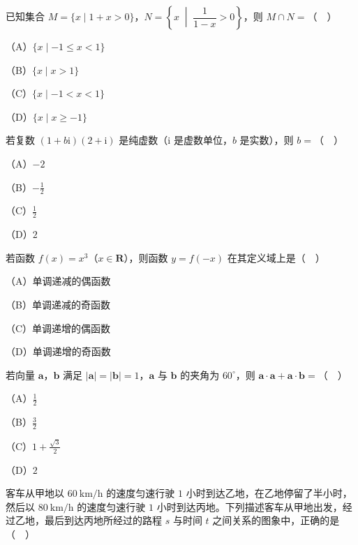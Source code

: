 


\begin{question}
已知集合 $M=\{x\mid 1+x>0\}$，$N=\left\{x\;\middle|\;\dfrac{1}{1-x}>0\right\}$，则 $M\cap N=$（　）

（A）$\{x\mid -1\leqslant x<1\}$

（B）$\{x\mid x>1\}$

（C）$\{x\mid -1<x<1\}$

（D）$\{x\mid x\geqslant -1\}$

\end{question}
\begin{question}
若复数 $(1+b\mathrm i)(2+\mathrm i)$ 是纯虚数（$\mathrm i$ 是虚数单位，$b$ 是实数），则 $b=$（　）

（A）$-2$

（B）$-\frac12$

（C）$\frac12$

（D）$2$

\end{question}
\begin{question}
若函数 $f(x)=x^3$（$x\in\mathbf R$），则函数 $y=f(-x)$ 在其定义域上是（　）

（A）单调递减的偶函数

（B）单调递减的奇函数

（C）单调递增的偶函数

（D）单调递增的奇函数

\end{question}
\begin{question}
若向量 $\boldsymbol a$，$\boldsymbol b$ 满足 $|\boldsymbol a|=|\boldsymbol b|=1$，$\boldsymbol a$ 与 $\boldsymbol b$ 的夹角为 $60^\circ$，则 $\boldsymbol a\cdot\boldsymbol a+\boldsymbol a\cdot\boldsymbol b=$（　）

（A）$\frac12$

（B）$\frac32$

（C）$1+\frac{\sqrt3}{2}$

（D）$2$

\Needspace{0.4\textheight}
\end{question}
\begingroup
\renewenvironment{question}{\Needspace{0.5\textheight}}{}
\begin{question}
客车从甲地以 $60\ \mathrm{km/h}$ 的速度匀速行驶 $1$ 小时到达乙地，在乙地停留了半小时，然后以 $80\ \mathrm{km/h}$ 的速度匀速行驶 $1$ 小时到达丙地。下列描述客车从甲地出发，经过乙地，最后到达丙地所经过的路程 $s$ 与时间 $t$ 之间关系的图象中，正确的是（　）
\nopagebreak[4]
\begin{center}\end{center}
\nopagebreak[4]
\end{question}
